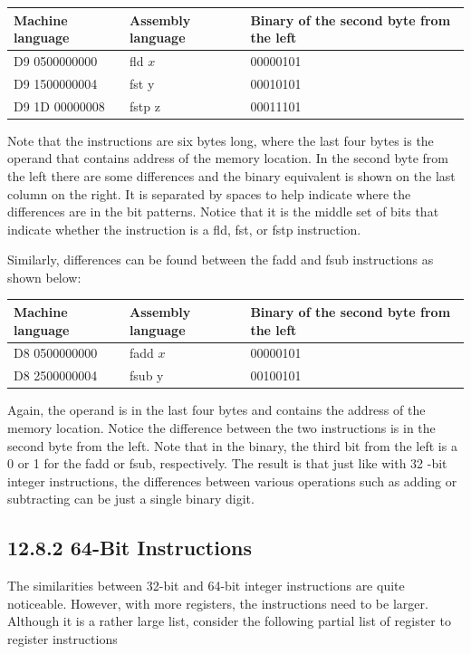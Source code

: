 \documentclass[10pt]{book}
\begin{document}
\begin{center}
\begin{tabular}{|l|l|l|}
\hline
Machine language & Assembly language & Binary of the second byte from the left \\
\hline
D9 0500000000 & fld $x$ & 00000101 \\
\hline
D9 1500000004 & fst y & 00010101 \\
\hline
D9 1D 00000008 & fstp z & 00011101 \\
\hline
\end{tabular}
\end{center}

Note that the instructions are six bytes long, where the last four bytes is the operand that contains address of the memory location. In the second byte from the left there are some differences and the binary equivalent is shown on the last column on the right. It is separated by spaces to help indicate where the differences are in the bit patterns. Notice that it is the middle set of bits that indicate whether the instruction is a fld, fst, or fstp instruction.

Similarly, differences can be found between the fadd and fsub instructions as shown below:

\begin{center}
\begin{tabular}{|l|l|l|}
\hline
Machine language & Assembly language & Binary of the second byte from the left \\
\hline
D8 0500000000 & fadd $x$ & 00000101 \\
\hline
D8 2500000004 & fsub y & 00100101 \\
\hline
\end{tabular}
\end{center}

Again, the operand is in the last four bytes and contains the address of the memory location. Notice the difference between the two instructions is in the second byte from the left. Note that in the binary, the third bit from the left is a 0 or 1 for the fadd or fsub, respectively. The result is that just like with 32 -bit integer instructions, the differences between various operations such as adding or subtracting can be just a single binary digit.

\subsection*{12.8.2 64-Bit Instructions}
The similarities between 32-bit and 64-bit integer instructions are quite noticeable. However, with more registers, the instructions need to be larger. Although it is a rather large list, consider the following partial list of register to register instructions
\end{document}
